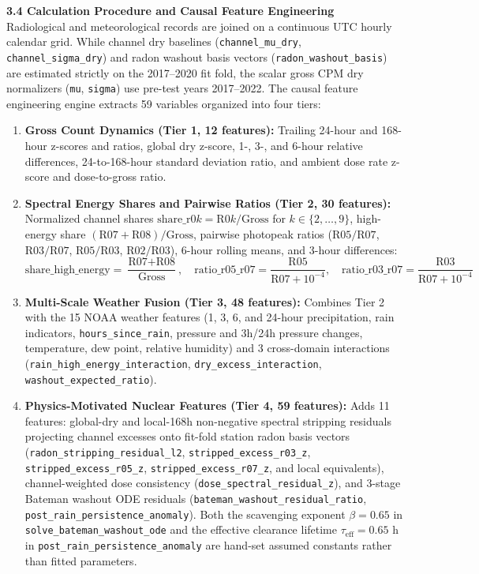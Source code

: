 \documentclass[11pt,a4paper]{article}
\begin{document}
\begin{framed}
\vspace{0.6em}
\noindent\textbf{3.4 Calculation Procedure and Causal Feature Engineering}\\[0.3em]
Radiological and meteorological records are joined on a continuous UTC hourly calendar grid. While channel dry baselines (\texttt{channel\_mu\_dry}, \texttt{channel\_sigma\_dry}) and radon washout basis vectors (\texttt{radon\_washout\_basis}) are estimated strictly on the 2017--2020 fit fold, the scalar gross CPM dry normalizers (\texttt{mu}, \texttt{sigma}) use pre-test years 2017--2022. The causal feature engineering engine extracts 59 variables organized into four tiers:
\begin{enumerate}
    \item \textbf{Gross Count Dynamics (Tier 1, 12 features):} Trailing 24-hour and 168-hour z-scores and ratios, global dry z-score, 1-, 3-, and 6-hour relative differences, 24-to-168-hour standard deviation ratio, and ambient dose rate z-score and dose-to-gross ratio.
    \item \textbf{Spectral Energy Shares and Pairwise Ratios (Tier 2, 30 features):} Normalized channel shares $\text{share\_r0}k = \text{R0}k / \text{Gross}$ for $k \in \{2,\dots,9\}$, high-energy share $(\text{R07}+\text{R08})/\text{Gross}$, pairwise photopeak ratios ($\text{R05}/\text{R07}$, $\text{R03}/\text{R07}$, $\text{R05}/\text{R03}$, $\text{R02}/\text{R03}$), 6-hour rolling means, and 3-hour differences:
    \begin{equation}
        \text{share\_high\_energy} = \frac{\text{R07} + \text{R08}}{\text{Gross}}, \quad \text{ratio\_r05\_r07} = \frac{\text{R05}}{\text{R07} + 10^{-4}}, \quad \text{ratio\_r03\_r07} = \frac{\text{R03}}{\text{R07} + 10^{-4}}
    \end{equation}
    \item \textbf{Multi-Scale Weather Fusion (Tier 3, 48 features):} Combines Tier 2 with the 15 NOAA weather features (1, 3, 6, and 24-hour precipitation, rain indicators, \texttt{hours\_since\_rain}, pressure and 3h/24h pressure changes, temperature, dew point, relative humidity) and 3 cross-domain interactions (\texttt{rain\_high\_energy\_interaction}, \texttt{dry\_excess\_interaction}, \texttt{washout\_expected\_ratio}).
    \item \textbf{Physics-Motivated Nuclear Features (Tier 4, 59 features):} Adds 11 features: global-dry and local-168h non-negative spectral stripping residuals projecting channel excesses onto fit-fold station radon basis vectors (\texttt{radon\_stripping\_residual\_l2}, \texttt{stripped\_excess\_r03\_z}, \texttt{stripped\_excess\_r05\_z}, \texttt{stripped\_excess\_r07\_z}, and local equivalents), channel-weighted dose consistency (\texttt{dose\_spectral\_residual\_z}), and 3-stage Bateman washout ODE residuals (\texttt{bateman\_washout\_residual\_ratio}, \texttt{post\_rain\_persistence\_anomaly}). Both the scavenging exponent $\beta = 0.65$ in \texttt{solve\_bateman\_washout\_ode} and the effective clearance lifetime $\tau_{\text{eff}} = 0.65\text{ h}$ in \texttt{post\_rain\_persistence\_anomaly} are hand-set assumed constants rather than fitted parameters.

\end{enumerate}
\end{framed}
\end{document}
